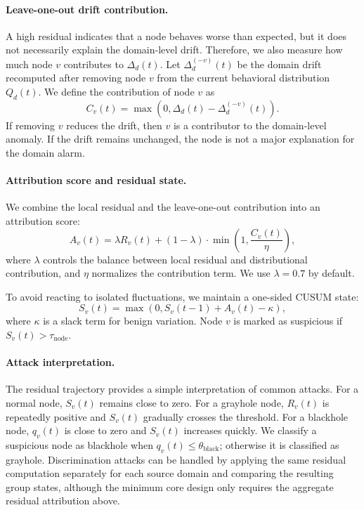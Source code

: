 \paragraph{Leave-one-out drift contribution.}
A high residual indicates that a node behaves worse than expected, but it
does not necessarily explain the domain-level drift. Therefore, we also
measure how much node $v$ contributes to $\Delta_d(t)$.
Let $\Delta_d^{(-v)}(t)$ be the domain drift recomputed after removing
node $v$ from the current behavioral distribution $Q_d(t)$. We define
the contribution of node $v$ as
\begin{equation}
    C_v(t) =
    \max\left(0, \Delta_d(t) - \Delta_d^{(-v)}(t)\right).
    \label{eq:contribution}
\end{equation}
If removing $v$ reduces the drift, then $v$ is a contributor to the
domain-level anomaly. If the drift remains unchanged, the node is not a
major explanation for the domain alarm.

\paragraph{Attribution score and residual state.}
We combine the local residual and the leave-one-out contribution into an
attribution score:
\begin{equation}
    A_v(t) =
    \lambda R_v(t) +
    (1-\lambda)\cdot
    \min\left(1, \frac{C_v(t)}{\eta}\right),
    \label{eq:attribution-score}
\end{equation}
where $\lambda$ controls the balance between local residual and
distributional contribution, and $\eta$ normalizes the contribution term.
We use $\lambda=0.7$ by default.

To avoid reacting to isolated fluctuations, we maintain a one-sided CUSUM
state:
\begin{equation}
    S_v(t) =
    \max\left(0, S_v(t-1) + A_v(t) - \kappa\right),
    \label{eq:cusum}
\end{equation}
where $\kappa$ is a slack term for benign variation. Node $v$ is marked
as suspicious if $S_v(t) > \tau_{\mathrm{node}}$.

\paragraph{Attack interpretation.}
The residual trajectory provides a simple interpretation of common attacks.
For a normal node, $S_v(t)$ remains close to zero. For a grayhole node,
$R_v(t)$ is repeatedly positive and $S_v(t)$ gradually crosses the
threshold. For a blackhole node, $q_v(t)$ is close to zero and
$S_v(t)$ increases quickly. We classify a suspicious node as blackhole
when $q_v(t) \leq \theta_{\mathrm{black}}$; otherwise it is classified
as grayhole. Discrimination attacks can be handled by applying the same
residual computation separately for each source domain and comparing the
resulting group states, although the minimum core design only requires
the aggregate residual attribution above.

